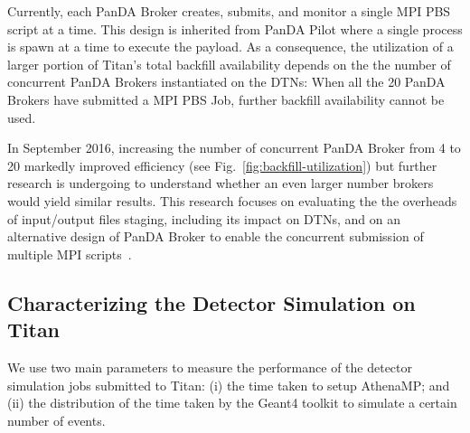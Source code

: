 Currently, each PanDA Broker creates, submits, and monitor a single MPI PBS
script at a time. This design is inherited from PanDA Pilot where a single
process is spawn at a time to execute the payload. As a consequence, the
utilization of a larger portion of Titan's total backfill availability depends
on the the number of concurrent PanDA Brokers instantiated on the DTNs: When all
the 20 PanDA Brokers have submitted a MPI PBS Job, further backfill availability
cannot be used.

In September 2016, increasing the number of concurrent PanDA Broker from 4 to 20
markedly improved efficiency (see Fig.~\ref{fig:backfill-utilization}) but
further research is undergoing to understand whether an even larger number
brokers would yield similar results. This research focuses on evaluating the the
overheads of input/output files staging, including its impact on DTNs, and on an
alternative design of PanDA Broker to enable the concurrent submission of
multiple MPI scripts~\cite{barreiro2016panda}.



\subsection{Characterizing the Detector Simulation on Titan}
\label{ssec:athenamp_titan}


We use two main parameters to measure the performance of the detector simulation
jobs submitted to Titan: (i) the time taken to setup AthenaMP; and (ii) the
distribution of the time taken by the Geant4 toolkit to simulate a certain
number of events.


